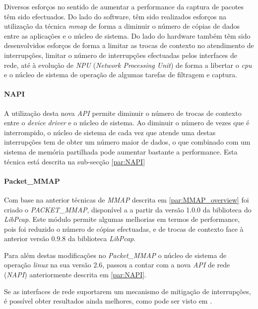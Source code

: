 Diversos esforços no sentido de aumentar a performance da captura de pacotes têm sido efectuados.
Do lado do software, têm sido realizados esforços na utilização da técnica \textit{mmap} de forma a diminuir o número de cópias de dados entre as aplicações e o núcleo de sistema.
Do lado do hardware também têm sido desenvolvidos esforços de forma a limitar as trocas de contexto no atendimento de interrupções, limitar o número de interrupções efectuadas pelos interfaces de rede, até à evolução de \textit{NPU} (\textit{Network Processing Unit}) de forma a libertar o \textit{cpu} e o núcleo de sistema de operação de algumas tarefas de filtragem e captura.

\paragraph*{NAPI}

A utilização desta nova \textit{API} permite diminuir o número de trocas de contexto entre o \textit{device driver} e o núcleo de sistema.
Ao diminuir o número de vezes que é interrompido, o núcleo de sistema de cada vez que atende uma destas interrupções tem de obter um número maior de dados, o que combinado com um sistema de memória partilhada pode aumentar bastante a performance.
Esta técnica está descrita na sub-secção \ref{par:NAPI}

\paragraph*{Packet\_MMAP}

Com base na anterior técnicas de \textit{MMAP} descrita em \ref{par:MMAP_overview} foi criado o \textit{PACKET\_MMAP}, disponível a a partir da versão 1.0.0 da biblioteca do \textit{LibPcap}.
Este módulo permite algumas melhorias em termos de performance, pois foi reduzido o número de cópias efectuadas, e de trocas de contexto face à anterior versão 0.9.8 da biblioteca \textit{LibPcap}.

Para além destas modificações no \textit{Packet\_MMAP} o núcleo de sistema de operação \textit{linux} na sua versão 2.6, passou a contar com a nova \textit{API} de rede (\textit{NAPI}) anteriormente descrita em \ref{par:NAPI}.

Se as interfaces de rede suportarem um mecanismo de mitigação de interrupções, é possível obter resultados ainda melhores, como pode ser visto em \cite{Deri2004}.

% 

